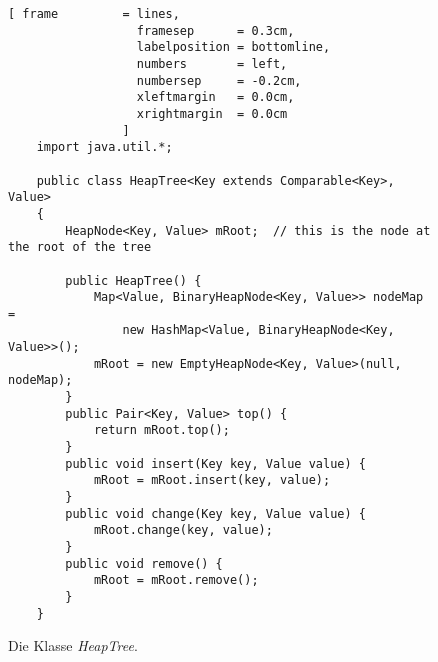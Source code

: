 \begin{figure}[!ht]
  \centering
\begin{Verbatim}[ frame         = lines, 
                  framesep      = 0.3cm, 
                  labelposition = bottomline,
                  numbers       = left,
                  numbersep     = -0.2cm,
                  xleftmargin   = 0.0cm,
                  xrightmargin  = 0.0cm
                ]
    import java.util.*;
    
    public class HeapTree<Key extends Comparable<Key>, Value>
    {
        HeapNode<Key, Value> mRoot;  // this is the node at the root of the tree 
    
        public HeapTree() {
            Map<Value, BinaryHeapNode<Key, Value>> nodeMap = 
                new HashMap<Value, BinaryHeapNode<Key, Value>>();
            mRoot = new EmptyHeapNode<Key, Value>(null, nodeMap);
        }
        public Pair<Key, Value> top() {
            return mRoot.top();
        }    
        public void insert(Key key, Value value) {
            mRoot = mRoot.insert(key, value);
        }
        public void change(Key key, Value value) {
            mRoot.change(key, value);
        }
        public void remove() {
            mRoot = mRoot.remove();
        }    
    }
\end{Verbatim}
\vspace*{-0.3cm}
  \caption{Die Klasse \textsl{HeapTree}.}
  \label{fig:HeapTree}
\end{figure}

